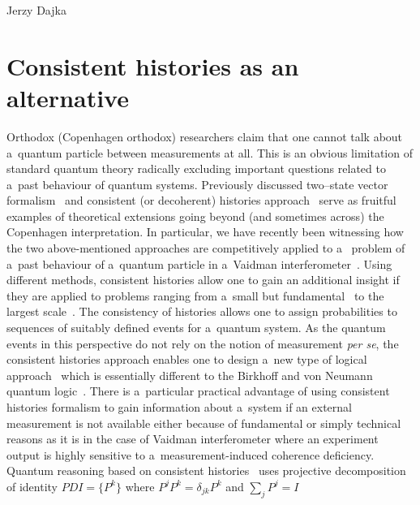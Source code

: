 \begin{artengenv}{Jerzy Dajka}

\section{Consistent histories as an alternative}  

Orthodox (Copenhagen orthodox) researchers claim that one 
cannot talk about a~quantum particle between measurements at all. This is an obvious limitation of standard quantum theory radically excluding important questions related to a~past behaviour of quantum systems.   
%
Previously discussed  two--state vector formalism~\parencite{Aharonov2008} and consistent (or decoherent) histories approach~\parencite{Griffiths,Griffiths1984,Omnes1988,Omnes1,gel1,gel} serve  as fruitful examples of theoretical extensions  going beyond (and sometimes across) the Copenhagen interpretation. In particular,  we have recently been  witnessing how  the two above-mentioned approaches are competitively applied to a~ problem  of a~past behaviour of a~quantum particle in a~Vaidman interferometer~\parencite{PhysRevA.87.052104,PhysRevA.95.066101,scirep}. Using different methods, consistent histories allow one to gain an additional insight if they are applied to  problems  ranging from a~small but fundamental~\parencite{GRIFFITHS_measur,GRIFFITHS_onto,Griffiths2014,mea1} to the largest scale~\parencite{zur1,q_cosm}. The consistency of  histories  allows one
to assign probabilities to sequences of suitably defined events for a~quantum system. As the quantum events in this perspective  do  not rely on the notion of measurement {\it per se}, the consistent histories approach enables one to design a~new type of logical approach~\parencite{Griffiths1984} which is essentially different to the Birkhoff and von Neumann quantum logic~\parencite{qlog}. There is a~particular practical advantage of using consistent histories formalism to gain information about a~system if
an external measurement is not available either because of fundamental or simply technical reasons as it is in the case of  Vaidman interferometer where an experiment output is highly sensitive to a~measurement-induced coherence deficiency. 
%
Quantum reasoning based on consistent histories~\parencite{Griffiths_reason} uses projective decomposition of identity $PDI=\{P^k\}$ 
where $P^jP^k =\delta_{jk}P^k$ and $\sum_j P^j=I$

\end{artengenv}
